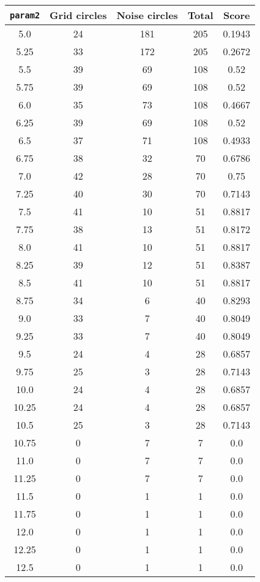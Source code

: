 \documentclass[letterpaper, 12pt]{article}
\begin{document}
\begin{longtable}{|c|c|c|c|c|}
\hline
\textbf{\texttt{param2}} & \textbf{Grid circles} & \textbf{Noise circles} & \textbf{Total} & \textbf{Score} \\
\hline
5.0 & 24 & 181 & 205 & 0.1943 \\
\hline
5.25 & 33 & 172 & 205 & 0.2672 \\
\hline
5.5 & 39 & 69 & 108 & 0.52 \\
\hline
5.75 & 39 & 69 & 108 & 0.52 \\
\hline
6.0 & 35 & 73 & 108 & 0.4667 \\
\hline
6.25 & 39 & 69 & 108 & 0.52 \\
\hline
6.5 & 37 & 71 & 108 & 0.4933 \\
\hline
6.75 & 38 & 32 & 70 & 0.6786 \\
\hline
7.0 & 42 & 28 & 70 & 0.75 \\
\hline
7.25 & 40 & 30 & 70 & 0.7143 \\
\hline
7.5 & 41 & 10 & 51 & 0.8817 \\
\hline
7.75 & 38 & 13 & 51 & 0.8172 \\
\hline
8.0 & 41 & 10 & 51 & 0.8817 \\
\hline
8.25 & 39 & 12 & 51 & 0.8387 \\
\hline
8.5 & 41 & 10 & 51 & 0.8817 \\
\hline
8.75 & 34 & 6 & 40 & 0.8293 \\
\hline
9.0 & 33 & 7 & 40 & 0.8049 \\
\hline
9.25 & 33 & 7 & 40 & 0.8049 \\
\hline
9.5 & 24 & 4 & 28 & 0.6857 \\
\hline
9.75 & 25 & 3 & 28 & 0.7143 \\
\hline
10.0 & 24 & 4 & 28 & 0.6857 \\
\hline
10.25 & 24 & 4 & 28 & 0.6857 \\
\hline
10.5 & 25 & 3 & 28 & 0.7143 \\
\hline
10.75 & 0 & 7 & 7 & 0.0 \\
\hline
11.0 & 0 & 7 & 7 & 0.0 \\
\hline
11.25 & 0 & 7 & 7 & 0.0 \\
\hline
11.5 & 0 & 1 & 1 & 0.0 \\
\hline
11.75 & 0 & 1 & 1 & 0.0 \\
\hline
12.0 & 0 & 1 & 1 & 0.0 \\
\hline
12.25 & 0 & 1 & 1 & 0.0 \\
\hline
12.5 & 0 & 1 & 1 & 0.0 \\

\end{longtable}
\end{document}
